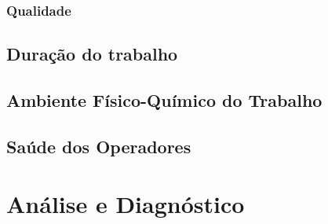 \documentclass[11pt]{article}
\begin{document}
\subsubsection{Qualidade}



\subsection{Duração do trabalho}



\subsection{Ambiente Físico-Químico do Trabalho}



\subsection{Saúde dos Operadores}




\section{Análise e Diagnóstico}
\end{document}
